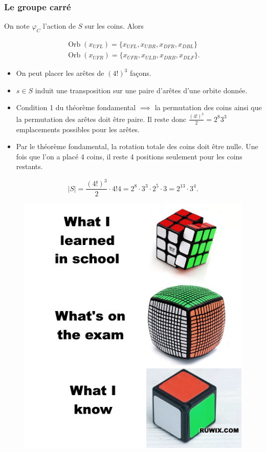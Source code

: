 \documentclass[10pt,notheorems]{beamer}
\theoremstyle{plain}
\theoremstyle{definition}
\theoremstyle{plain}
\theoremstyle{plain}
\theoremstyle{plain}
\theoremstyle{remark}
\begin{document}
\begin{frame}
  \frametitle{Le groupe carré}

  On note $\varphi_C$ l'action de $S$ sur les coins. Alors

  \begin{gather}
    \operatorname{Orb}(x _{UFL}) = \{ x _{UFL}, x _{UBR}, x _{DFR}, x _{DBL} \} \label{orbite_coins_1} \\
    \operatorname{Orb}(x _{UFR}) = \{ x _{UFR}, x _{ULB}, x _{DRB}, x _{DLF} \} \label{orbite_coins_2} .
  \end{gather}

  \begin{itemize}
    \item On peut placer les arêtes de $(4!) ^{3}$ façons.
    \item $s \in S$ induit une transposition sur une paire d'arêtes d'une orbite donnée.
    \item Condition 1 du théorème fondamental $\implies$ la permutation des coins ainsi que la permutation des arêtes doit être paire. Il reste donc $\frac{(4!) ^{3}}{2} = 2 ^{8} 3 ^{3}$ emplacements possibles pour les arêtes.
    \item Par le théorème fondamental, la rotation totale des coins doit être nulle. Une fois que l'on a placé 4 coins, il reste 4 positions seulement pour les coins restants.
  \end{itemize}
  $$\mid S \mid = \frac{(4!)^{3}}{2} \cdot 4! 4 = 2 ^{8} \cdot 3 ^{3} \cdot 2 ^{5} \cdot 3 = 2 ^{13} \cdot 3 ^{4}.$$
\end{frame}

\begin{frame}
  \begin{figure}
    \centering
    \includegraphics[scale=0.5]{figures/class-vs-exam.jpg}
    \caption{}
    \label{}
  \end{figure}
\end{frame}

\begin{frame}

\end{frame}
\end{document}
